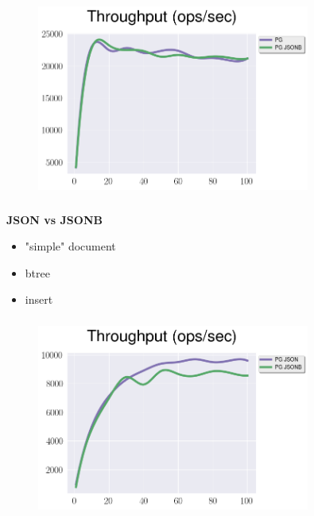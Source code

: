 \documentclass[usenames,dvipsnames, 18pt, compress, aspectratio=169]{beamer}
\begin{document}
\begin{frame}
    \frametitle{}
    \begin{center}
    \vspace{10pt}
    \begin{figure}
        \includegraphics[width=0.8\textwidth,center]{benchmarks/postgresql_run_jsonb_jdbc.png}
    \end{figure}
    \end{center}
\end{frame}

\begin{frame}
    \frametitle{}
    \begin{center}
        \textbf{JSON vs JSONB}
        \begin{itemize}[label={}]
            \item "simple" document
            \item btree
            \item insert
        \end{itemize}
    \end{center}
\end{frame}

\begin{frame}
    \frametitle{}
    \begin{center}
    \vspace{10pt}
    \begin{figure}
        \includegraphics[width=0.8\textwidth,center]{benchmarks/postgresql_load_json_jsonb.png}
    \end{figure}
    \end{center}
\end{frame}
\end{document}
